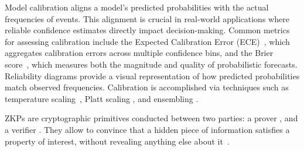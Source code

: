 
Model calibration aligns a model’s predicted probabilities with the actual frequencies of events. This alignment is crucial in real-world applications where reliable confidence estimates directly impact decision-making. Common metrics for assessing calibration include the Expected Calibration Error (ECE)~\citep{naeini2015obtaining}, which aggregates calibration errors across multiple confidence bins, and the Brier score~\citep{brier1950verification}, which measures both the magnitude and quality of probabilistic forecasts. Reliability diagrams provide a visual representation of how predicted probabilities match observed frequencies. Calibration is accomplished via techniques such as temperature scaling~\cite{guo2017calibration}, Platt scaling \cite{platt1999probabilistic}, and ensembling \cite{lakshminarayanan2017simple}.



 ZKPs are cryptographic primitives conducted between two parties: a prover \prover, and a verifier \verifier. They allow \prover to convince \verifier that a hidden piece of information satisfies a property of interest, without revealing anything else about it~\cite{goldwasser1985knowledge}. 

